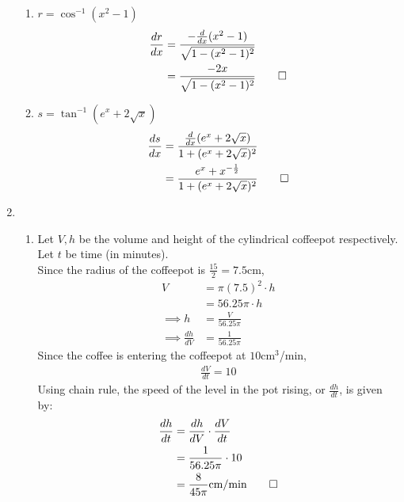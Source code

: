 \documentclass[12pt, a4paper]{article}
\begin{document}
\begin{enumerate}[Q\arabic*.]
\begin{enumerate}[(\alph*)]
      \item $\displaystyle r = \cos^{-1}(x^2-1)$
        \begin{align*}
          \frac{dr}{dx} &= \frac{-\frac{d}{dx}(x^2-1)}{\sqrt{1 - (x^2-1)^2}} \\
                        &= \frac{-2x}{\sqrt{1 - (x^2-1)^2}} \qed
        \end{align*}

      \item $\displaystyle s = \tan^{-1}(e^x + 2\sqrt{x})$
        \begin{align*}
          \frac{ds}{dx} &= \frac{\frac{d}{dx}(e^x+2\sqrt{x})}{1 + (e^x + 2\sqrt{x})^2} \\
                        &= \frac{e^x + x^{-\frac{1}{2}}}{1 + (e^x + 2\sqrt{x})^2} \qed
        \end{align*}
    \end{enumerate}


  \item \begin{enumerate}[(\alph*)]
      \item Let $V, h$ be the volume and height of the cylindrical coffeepot respectively. Let $t$ be time (in minutes). \\
        Since the radius of the coffeepot is $\frac{15}{2} = 7.5$cm,
        \begin{align*}
          V &= \pi(7.5)^2\cdot h \\
            &= 56.25\pi \cdot h \\
          \implies h &= \frac{V}{56.25\pi} \\
          \implies \frac{dh}{dV} &= \frac{1}{56.25\pi}
        \end{align*}
        Since the coffee is entering the coffeepot at $10$cm$^3$/min,
        \begin{align*}
          \frac{dV}{dt} = 10
        \end{align*}
        Using chain rule, the speed of the level in the pot rising, or $\frac{dh}{dt}$, is given by:
        \begin{align*}
          \frac{dh}{dt} &= \frac{dh}{dV} \cdot \frac{dV}{dt} \\
                        &= \frac{1}{56.25\pi} \cdot 10 \\
                        &= \frac{8}{45\pi} \text{cm/min} \qed
        \end{align*}


\end{enumerate}
\end{enumerate}
\end{document}
